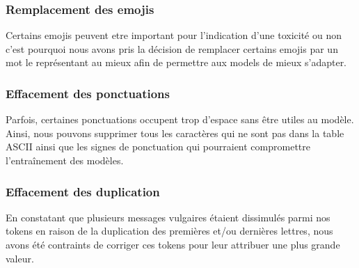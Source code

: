 \subsubsection*{Remplacement des emojis}

Certains emojis peuvent etre important pour l'indication d'une toxicité ou non c'est pourquoi nous avons pris la décision de remplacer certains emojis par un mot le représentant au mieux afin de permettre aux models de mieux s'adapter.

\subsubsection*{Effacement des ponctuations}

Parfois, certaines ponctuations occupent trop d’espace sans être utiles au modèle. Ainsi, nous pouvons supprimer tous les caractères qui ne sont pas dans la table ASCII ainsi que les signes de ponctuation qui pourraient compromettre l’entraînement des modèles.

\subsubsection*{Effacement des duplication}
En constatant que plusieurs messages vulgaires étaient dissimulés parmi nos tokens en raison de la duplication des premières et/ou dernières lettres, nous avons été contraints de corriger ces tokens pour leur attribuer une plus grande valeur.

